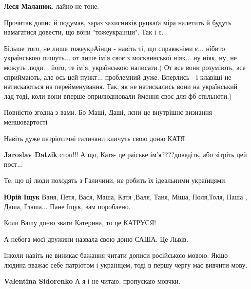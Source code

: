 \begin{itemize}
\begin{itemize}
\textbf{Леся Маланюк}, лайно не тоне.
\end{itemize} %


Прочитав допис й подумав, зараз захисників руцкаґа міра налетить й будуть
намагатися довести, що вони "тожеукраінци". Так і є.

\begin{itemize} %

Більше того, не лише тожеукрАінци - навіть ті, що справжніми є... нібито
українською пишуть... от лише ім'я своє з москвинської ніяк... ну ніяк, ну, не
можуть люди... його, те ім'я, українською написати.) От все вони розуміють, все
сприймають, але ось цей пункт... проблемний дуже. Вперлись - і клавіші не
натискаються на перейменування. Так, як не натискались вони на український лад
тоді, коли вони вперше оприлюднювали ймення своє для фб-спільноти.)

\end{itemize} %

Повністю згодна з вами. Бо Маші, Даші, лєни це внутрішнє визнання меншовартості

Навіть дуже патріотичні галичани кличуть свою доню КАТЯ.

\begin{itemize} %
\textbf{Jaroslav Datzik} стоп!!! А що, Катя- це раіське ім'я????доведіть, або зітріть цей пост...

Те, що ці люди походять з Галичини, не робить їх ідеальними українцями.

\textbf{Юрій Іщук} Ваня, Петя, Вася, Маша, Катя ,Валя, Таня, Міша, Поля,Толя, Паша , Даша, Ґлаша... Пане Іщук, вам пороблено.

Коли Вашу доню звати Катерина, то це КАТРУСЯ!
\end{itemize} %

А небога моєї дружини назвала свою доню САША. Це Львів.


Інколи навіть не виникає бажання читати дописи російською мовою. Якщо людина
вважає себе патріотом і українцем, тоді в першу чергу має вивчити мову.

\begin{itemize} %
\textbf{Valentina Sidorenko} А я і не читаю. пропускаю мовчки.
\end{itemize} %


\end{itemize}
